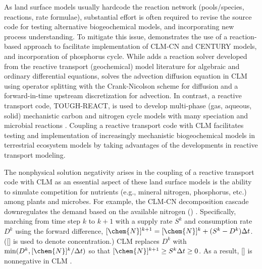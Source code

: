 \documentclass[gmd, manuscript]{copernicus}
\begin{document}
As land surface models usually hardcode the reaction network (pools/species,
reactions, rate formulae), substantial effort is often required to revise the
source code for testing alternative biogeochemical models, and incorporating new
process understanding. To mitigate this issue, \citet{Fang2013} demonstrates
the use of a reaction-based approach to facilitate implementation of CLM-CN and
CENTURY models, and incorporation of phosphorus cycle. While \citet{Fang2013}
adds a reaction solver developed from the reactive transport (geochemical)
model literature for algebraic and ordinary differential equations,
\citet{Tang2013b} solves the advection diffusion equation in CLM using operator
splitting with the Crank-Nicolson scheme for diffusion and a forward-in-time
upstream discretization for advection. In contrast, a reactive transport code,
TOUGH-REACT, is used to develop multi-phase (gas, aqueous, solid) mechanistic
carbon and nitrogen cycle models with many speciation and microbial reactions
\citep{Maggi2008,Gu2010,Riley2014}. Coupling a reactive
transport code \citep[e.g.,][]{Steefel2014} with CLM facilitates testing
and implementation of increasingly mechanistic biogeochemical models in
terrestrial ecosystem models by taking advantages of the developments in
reactive transport modeling.


The nonphysical solution negativity arises in the coupling of a reactive transport code
with CLM as an essential aspect of these land surface models is the ability to simulate
competition for nutrients (e.g., mineral nitrogen, phosphorus, etc.) among
plants and microbes. For example, the CLM-CN decomposition cascade
downregulates the demand based on the available nitrogen ()
\citep{Oleson2013,Thornton2005}. Specifically, marching from time step $k$ to
$k+1$ with a supply rate $S^k$ and consumption rate $D^k$ using the forward
difference, $[\chem{N}]^{k+1} = [\chem{N}]^k + (S^k - D^k) \Delta t$. ([] is
used to denote concentration.) CLM replaces $D^k$ with $\min(D^k,
[\chem{N}]^k/\Delta t)$ so that $[\chem{N}]^{k+1} \geq S^k \Delta t \geq 0$. As
a result, [] is nonnegative in CLM \citep{Tang2015}.
 
\end{document}
